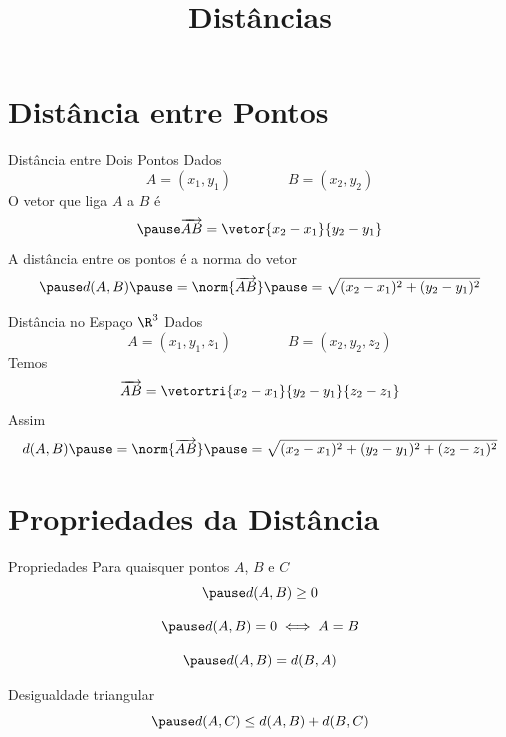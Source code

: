 \documentclass[fleqn,aspectratio=169,12pt]{beamer}
\title{Distâncias}
\begin{document}
\addtitle

\section{Distância entre Pontos}


\begin{frame}[t]{Distância entre Dois Pontos}
  Dados
  \[
    A = ( x_1, y_1 )
    \qquad\qquad
    B = ( x_2, y_2 )
  \]
  \pause
  O vetor que liga $A$ a $B$ é
  \[
    \pause
    \overrightarrow{AB} = \vetor{x_2-x_1}{y_2-y_1}
  \]
  \pause
  A distância entre os pontos é a norma do vetor
  \[
    \pause
    d(A, B)
    \pause
    = \norm{\overrightarrow{AB}}
    \pause
    = \sqrt{(x_2-x_1)^{2} + (y_2-y_1)^{2}}
  \]
\end{frame}

\begin{frame}[t]{Distância no Espaço $\R^3$}
  Dados
  \[
    A = (x_1, y_1, z_1)
    \qquad\qquad
    B = (x_2, y_2, z_2)
  \]
  \pause
  Temos
  \[
    \overrightarrow{AB}
    = \vetortri{x_2-x_1}{y_2-y_1}{z_2-z_1}
  \]
  \pause
  Assim
  \[
    d(A, B)
    \pause
    = \norm{\overrightarrow{AB}}
    \pause
    = \sqrt{ (x_2-x_1)^{2} + (y_2-y_1)^{2} + (z_2-z_1)^{2} }
  \]
\end{frame}

\section{Propriedades da Distância}

\begin{frame}{Propriedades}
  Para quaisquer pontos $A$, $B$ e $C$
  \[
    \pause
    d(A, B) \geq 0
  \]

  \[
    \pause
    d(A, B) = 0 \iff A = B
  \]

  \[
    \pause
    d(A, B) = d(B, A)
  \]

  \pause
  Desigualdade triangular
  \[
    \pause
    d(A, C) \leq d(A, B) + d(B, C)
  \]
\end{frame}
\end{document}
